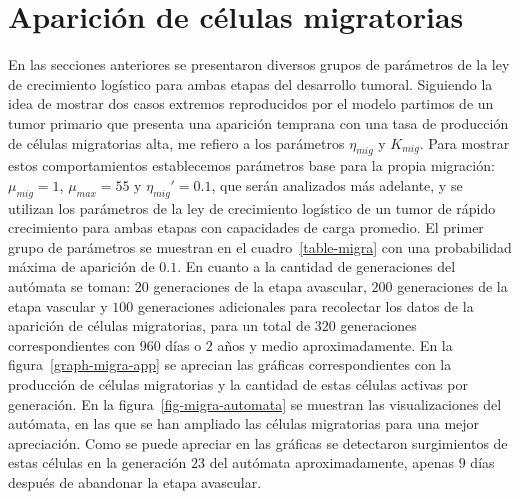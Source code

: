 \section{Aparici\'on de c\'elulas migratorias}
\label{sec-migra-app-results}
En las secciones anteriores se presentaron diversos grupos de par\'ametros de la ley de crecimiento log\'istico para ambas etapas del desarrollo tumoral. Siguiendo la idea de mostrar dos casos extremos reproducidos por el modelo partimos de un tumor primario que presenta una aparici\'on temprana con una tasa de producci\'on de c\'elulas migratorias alta, me refiero a los par\'ametros $\eta_{mig}$ y $K_{mig}$. Para mostrar estos comportamientos establecemos par\'ametros base para la propia migraci\'on: $\mu_{mig}=1$, $\mu_{max}=55$ y $\eta_{mig}'=0$.$1$, que ser\'an analizados m\'as adelante, y se utilizan los par\'ametros de la ley de crecimiento log\'istico de un tumor de r\'apido crecimiento para ambas etapas con capacidades de carga promedio. El primer grupo de par\'ametros se muestran en el cuadro~\ref{table-migra} con una probabilidad m\'axima de aparici\'on de $0$.$1$. En cuanto a la cantidad de generaciones del aut\'omata se toman: $20$ generaciones de la etapa avascular, $200$ generaciones de la etapa vascular y $100$ generaciones adicionales para recolectar los datos de la aparici\'on de c\'elulas migratorias, para un total de $320$ generaciones correspondientes con $960$ d\'ias o $2$ a\~nos y medio aproximadamente. En la figura~\ref{graph-migra-app} se aprecian las gr\'aficas correspondientes con la producci\'on de c\'elulas migratorias y la cantidad de estas c\'elulas activas por generaci\'on. En la figura~\ref{fig-migra-automata} se muestran las visualizaciones del aut\'omata, en las que se han ampliado las c\'elulas migratorias para una mejor apreciaci\'on. Como se puede apreciar en las gr\'aficas se detectaron surgimientos de estas c\'elulas en la generaci\'on $23$ del aut\'omata aproximadamente, apenas $9$ d\'ias despu\'es de abandonar la etapa avascular. 
\begin{table}[!ht]
\begin{center}
\vspace*{-0.6cm}
\end{center}
\caption[Par\'ametros de la regla de la aparici\'on de c\'elulas migratorias de un carcinoma ductal infiltrante con alta tasa de producci\'on y aparici\'on temprana]{Par\'ametros de la regla de la aparici\'on de c\'elulas migratorias de un carcinoma ductal infiltrante con alta tasa de producci\'on y aparici\'on temprana.}
\label{table-migra}
\end{table}

